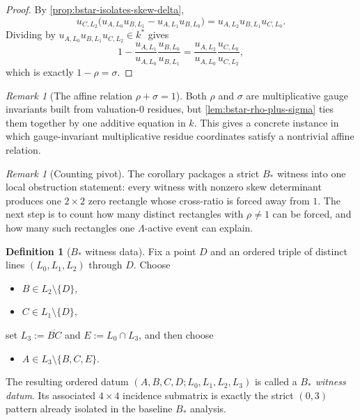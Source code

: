 \documentclass[11pt]{amsart}
\numberwithin{equation}{section}
\theoremstyle{plain}
\theoremstyle{definition}
\newtheorem{definition}[theorem]{Definition}
\theoremstyle{remark}
\newtheorem{remark}[theorem]{Remark}
\newcommand{\Lam}{\Lambda}
\begin{document}
\begin{proof}
By \cref{prop:bstar-isolates-skew-delta},
\[
u_{C,L_2}\bigl(u_{A,L_0}u_{B,L_1}-u_{A,L_1}u_{B,L_0}\bigr)=u_{A,L_2}u_{B,L_1}u_{C,L_0}.
\]
Dividing by $u_{A,L_0}u_{B,L_1}u_{C,L_2}\in k^*$ gives
\[
1-\frac{u_{A,L_1}}{u_{A,L_0}}\frac{u_{B,L_0}}{u_{B,L_1}}
=
\frac{u_{A,L_2}}{u_{A,L_0}}\frac{u_{C,L_0}}{u_{C,L_2}},
\]
which is exactly $1-\rho=\sigma$.
\end{proof}

\begin{remark}[The affine relation $\rho+\sigma=1$]
\label{rem:rho-plus-sigma-hyperaddition}
Both $\rho$ and $\sigma$ are multiplicative gauge invariants built from valuation-$0$ residues, but \cref{lem:bstar-rho-plus-sigma} ties them together by one additive equation in $k$. This gives a concrete instance in which gauge-invariant multiplicative residue coordinates satisfy a nontrivial affine relation.
\end{remark}

\begin{remark}[Counting pivot]
\label{rem:counting-pivot-rho-ne-1}
The corollary packages a strict $B_*$ witness into one local obstruction statement: every witness with nonzero skew determinant produces one $2\times2$ zero rectangle whose cross-ratio is forced away from $1$. The next step is to count how many distinct rectangles with $\rho\neq1$ can be forced, and how many such rectangles one $\Lam$-active event can explain.
\end{remark}

\begin{definition}[$B_*$ witness data]
\label{def:bstar-witness-data}
Fix a point $D$ and an ordered triple of distinct lines $(L_0,L_1,L_2)$ through $D$. Choose
\begin{itemize}[leftmargin=2em]
  \item $B\in L_2\setminus\{D\}$,
  \item $C\in L_1\setminus\{D\}$,
\end{itemize}
set $L_3:=\overline{BC}$ and $E:=L_0\cap L_3$, and then choose
\begin{itemize}[leftmargin=2em]
  \item $A\in L_3\setminus\{B,C,E\}$.
\end{itemize}
The resulting ordered datum $(A,B,C,D;L_0,L_1,L_2,L_3)$ is called a \emph{$B_*$ witness datum}. Its associated $4\times4$ incidence submatrix is exactly the strict $(0,3)$ pattern already isolated in the baseline $B_*$ analysis.
\end{definition}
\end{document}
